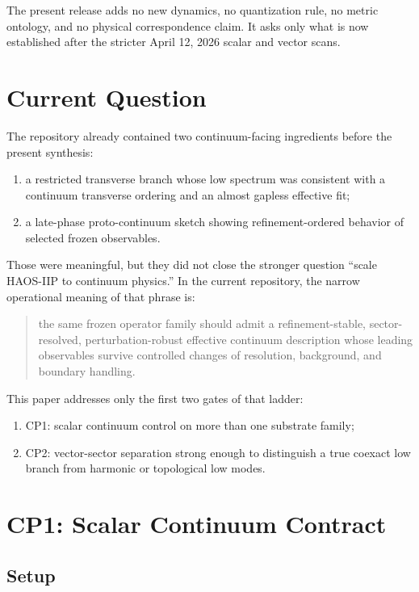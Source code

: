 \documentclass[11pt]{article}
\begin{document}
The present release adds no new dynamics, no quantization rule, no metric ontology, and no physical correspondence claim. It asks only what is now established after the stricter April 12, 2026 scalar and vector scans.

\section{Current Question}

The repository already contained two continuum-facing ingredients before the present synthesis:
\begin{enumerate}
\item a restricted transverse branch whose low spectrum was consistent with a continuum transverse ordering and an almost gapless effective fit;
\item a late-phase proto-continuum sketch showing refinement-ordered behavior of selected frozen observables.
\end{enumerate}

Those were meaningful, but they did not close the stronger question ``scale HAOS-IIP to continuum physics.'' In the current repository, the narrow operational meaning of that phrase is:
\begin{quote}
the same frozen operator family should admit a refinement-stable, sector-resolved, perturbation-robust effective continuum description whose leading observables survive controlled changes of resolution, background, and boundary handling.
\end{quote}

This paper addresses only the first two gates of that ladder:
\begin{enumerate}
\item CP1: scalar continuum control on more than one substrate family;
\item CP2: vector-sector separation strong enough to distinguish a true coexact low branch from harmonic or topological low modes.
\end{enumerate}

\section{CP1: Scalar Continuum Contract}

\subsection{Setup}
\end{document}
